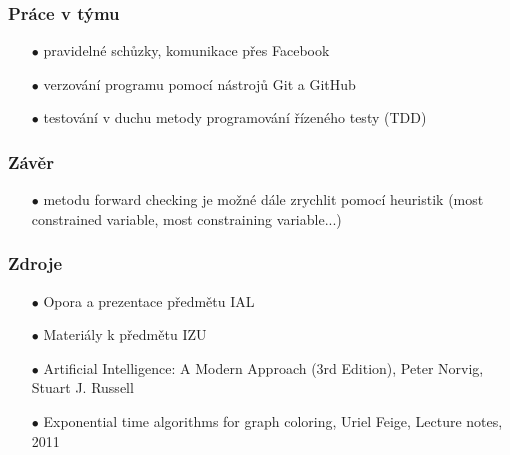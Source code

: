 \documentclass[10pt,xcolor=pdflatex]{beamer}
\begin{document}
\begin{frame}\frametitle{Práce v týmu}
    \begin{itemize}
    	\item[$\bullet$] pravidelné schůzky, komunikace přes Facebook
    	\item[$\bullet$] verzování programu pomocí nástrojů Git a GitHub
    	\item[$\bullet$] testování v duchu metody programování řízeného testy (TDD)
	\end{itemize}
\end{frame}

\begin{frame}\frametitle{Závěr}
    \begin{itemize}
        \item[$\bullet$] metodu forward checking je možné dále zrychlit pomocí heuristik (most constrained variable, most constraining variable...)
    \end{itemize}
\end{frame}


\begin{frame}\frametitle{Zdroje}
    \begin{itemize}
        \item[$\bullet$] Opora a prezentace předmětu IAL
        \item[$\bullet$] Materiály k předmětu IZU
        \item[$\bullet$] Artificial Intelligence: A Modern Approach (3rd Edition), Peter Norvig, Stuart J. Russell
        \item[$\bullet$] Exponential time algorithms for graph coloring, Uriel Feige, Lecture notes, 2011
    \end{itemize}
\end{frame}
\end{document}
